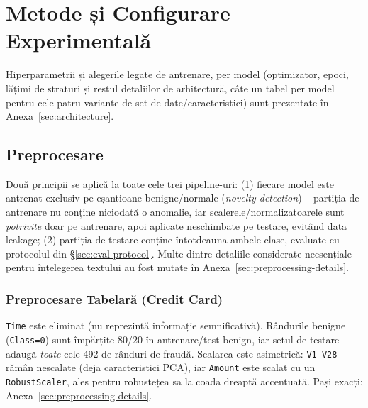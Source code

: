 \chapter{Metode și Configurare Experimentală}
\label{ch:methodology}


Hiperparametrii și alegerile legate de antrenare, per model (optimizator, epoci, lățimi de straturi și restul detaliilor de arhitectură, câte un tabel per model pentru cele patru variante de set de date/caracteristici) sunt prezentate în Anexa~\ref{sec:architecture}.

\section{Preprocesare}
\label{sec:preprocessing}

Două principii se aplică la toate cele trei pipeline-uri: (1) fiecare model este antrenat exclusiv pe eșantioane benigne/normale (\emph{novelty detection}) -- partiția de antrenare nu conține niciodată o anomalie, iar scalerele/normalizatoarele sunt \emph{potrivite} doar pe antrenare, apoi aplicate neschimbate pe testare, evitând data leakage; 
(2) partiția de testare conține întotdeauna ambele clase, evaluate cu protocolul din \S\ref{sec:eval-protocol}. Multe dintre detaliile considerate neesențiale pentru înțelegerea textului au fost mutate în Anexa~\ref{sec:preprocessing-details}.

\subsection{Preprocesare Tabelară (Credit Card)}

\texttt{Time} este eliminat (nu reprezintă informație semnificativă). Rândurile benigne (\texttt{Class=0}) sunt împărțite 80/20 în antrenare/test-benign, iar setul de testare adaugă \emph{toate} cele 492 de rânduri de fraudă. Scalarea este asimetrică: \texttt{V1--V28} rămân nescalate (deja caracteristici PCA), iar \texttt{Amount} este scalat cu un \texttt{RobustScaler}, ales pentru robustețea sa la coada dreaptă accentuată. Pași exacți: Anexa~\ref{sec:preprocessing-details}.

